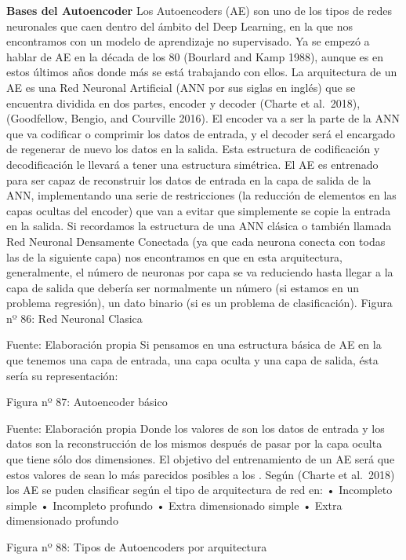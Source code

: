 \documentclass[
  a4paper,
  DIV=11,
  numbers=noendperiod]{scrreprt}
\begin{document}
\textbf{Bases del Autoencoder} Los Autoencoders (AE) son uno de los
tipos de redes neuronales que caen dentro del ámbito del Deep Learning,
en la que nos encontramos con un modelo de aprendizaje no supervisado.
Ya se empezó a hablar de AE en la década de los 80 (Bourlard and Kamp
1988), aunque es en estos últimos años donde más se está trabajando con
ellos. La arquitectura de un AE es una Red Neuronal Artificial (ANN por
sus siglas en inglés) que se encuentra dividida en dos partes, encoder y
decoder (Charte et al.~2018), (Goodfellow, Bengio, and Courville 2016).
El encoder va a ser la parte de la ANN que va codificar o comprimir los
datos de entrada, y el decoder será el encargado de regenerar de nuevo
los datos en la salida. Esta estructura de codificación y decodificación
le llevará a tener una estructura simétrica. El AE es entrenado para ser
capaz de reconstruir los datos de entrada en la capa de salida de la
ANN, implementando una serie de restricciones (la reducción de elementos
en las capas ocultas del encoder) que van a evitar que simplemente se
copie la entrada en la salida. Si recordamos la estructura de una ANN
clásica o también llamada Red Neuronal Densamente Conectada (ya que cada
neurona conecta con todas las de la siguiente capa) nos encontramos en
que en esta arquitectura, generalmente, el número de neuronas por capa
se va reduciendo hasta llegar a la capa de salida que debería ser
normalmente un número (si estamos en un problema regresión), un dato
binario (si es un problema de clasificación). Figura nº 86: Red Neuronal
Clasica

Fuente: Elaboración propia Si pensamos en una estructura básica de AE en
la que tenemos una capa de entrada, una capa oculta y una capa de
salida, ésta sería su representación:

Figura nº 87: Autoencoder básico

Fuente: Elaboración propia Donde los valores de son los datos de entrada
y los datos son la reconstrucción de los mismos después de pasar por la
capa oculta que tiene sólo dos dimensiones. El objetivo del
entrenamiento de un AE será que estos valores de sean lo más parecidos
posibles a los . Según (Charte et al.~2018) los AE se puden clasificar
según el tipo de arquitectura de red en: • Incompleto simple •
Incompleto profundo • Extra dimensionado simple • Extra dimensionado
profundo

Figura nº 88: Tipos de Autoencoders por arquitectura
\end{document}
